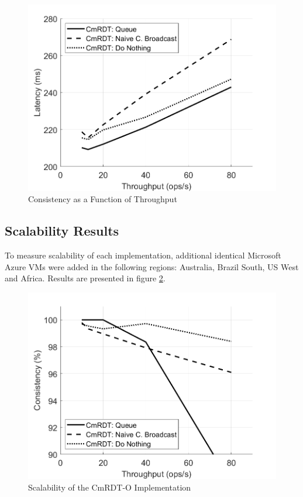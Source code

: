 \documentclass[sigconf,nonacm,10pt]{acmart}
\begin{document}
\begin{figure}[h]
  \centering
  \includegraphics[width=\linewidth]{Fig8Eval2}
  \caption{Consistency as a Function of Throughput}
  \label{fig:eval2}
\end{figure}

\subsection{Scalability Results}
To measure scalability of each implementation, additional identical Microsoft Azure VMs were added in the following regions: Australia, Brazil South, US West and Africa. Results are presented in figure \ref{fig:eval3}.

\begin{figure}[h]
  \centering
  \includegraphics[width=\linewidth]{Fig9Eval3}
  \caption{Scalability of the CmRDT-O Implementation}
  \label{fig:eval3}
\end{figure}
\end{document}
